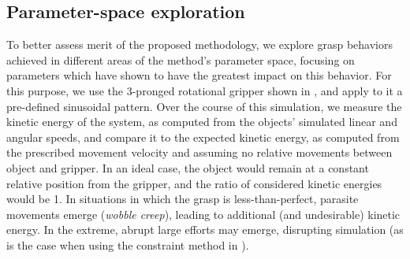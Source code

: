 \subsection{Parameter-space exploration}
\label{sec:comparison}
%
To better assess merit of the proposed methodology, we explore grasp behaviors achieved in different areas of the method's parameter space, focusing on parameters which have shown to have the greatest impact on this behavior. For this purpose,
we use the 3-pronged rotational gripper shown in , and apply to it a pre-defined sinusoidal pattern. Over the course of this simulation, we measure the kinetic energy of the system, as computed from the objects' simulated linear and angular speeds, and compare it to the expected kinetic energy, as computed from the prescribed movement velocity and assuming no relative movements between object and gripper. In an ideal case, the object would remain at a constant relative position from the gripper, and the ratio of considered kinetic energies would be 1. In situations in which the grasp is less-than-perfect, parasite movements emerge (\emph{wobble creep}), leading to additional (and undesirable) kinetic energy. In the extreme, abrupt large efforts may emerge, disrupting simulation (as is the case when using the constraint method in ).

